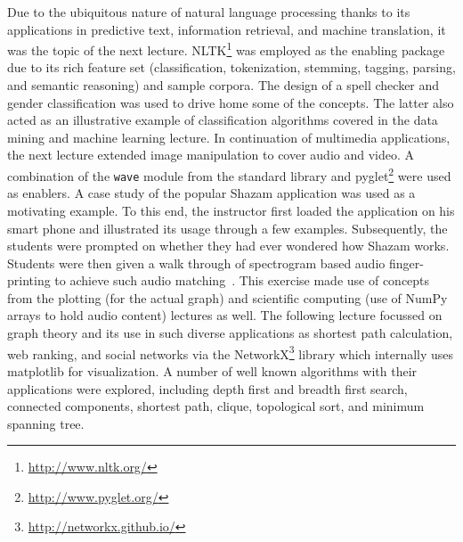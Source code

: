 \documentclass[letterpaper,twocolumn,10pt]{article}
\begin{document}
\noindent
Due to the ubiquitous nature of natural language processing thanks to its
applications in predictive text, information retrieval, and machine translation,
it was the topic of the next lecture. NLTK\footnote{\url{http://www.nltk.org/}}
was employed as the enabling package due to its rich feature set
(classification, tokenization, stemming, tagging, parsing, and semantic
reasoning) and sample corpora. The design of a spell checker and gender
classification was used to drive home some of the concepts. The latter also
acted as an illustrative example of classification algorithms covered in the
data mining and machine learning lecture. In continuation of multimedia
applications, the next lecture extended image manipulation to cover audio and
video. A combination of the \texttt{wave} module from the standard library and
pyglet\footnote{\url{http://www.pyglet.org/}} were used as enablers. A case
study of the popular Shazam application was used as a motivating example. To
this end, the instructor first loaded the application on his smart phone and
illustrated its usage through a few examples. Subsequently, the students were
prompted on whether they had ever wondered how Shazam works. Students were then
given a walk through of spectrogram based audio finger-printing to achieve such
audio matching~\cite{Wang:2003:Shazam}. This exercise made use of concepts from
the plotting (for the actual graph) and scientific computing (use of NumPy
arrays to hold audio content) lectures as well. The following lecture focussed
on graph theory and its use in such diverse applications as shortest path
calculation, web ranking, and social networks via the
NetworkX\footnote{\url{http://networkx.github.io/}} library which internally
uses matplotlib for visualization. A number of well known algorithms with their
applications were explored, including depth first and breadth first search,
connected components, shortest path, clique, topological sort, and minimum
spanning tree.
\end{document}
